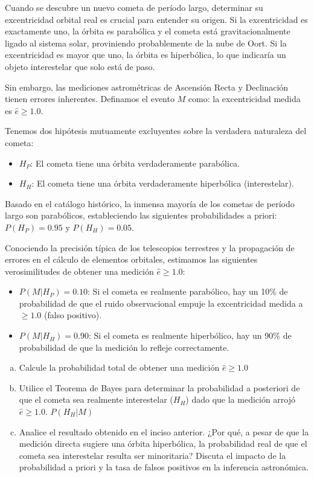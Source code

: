 \documentclass[a4paper]{article}
\begin{document}
Cuando se descubre un nuevo cometa de período largo, determinar su excentricidad orbital real es crucial para entender su origen. Si la excentricidad es exactamente uno, la órbita es parabólica y el cometa está gravitacionalmente ligado al sistema solar, proviniendo probablemente de la nube de Oort. Si la excentricidad es mayor que uno, la órbita es hiperbólica, lo que indicaría un objeto interestelar que solo está de paso.

Sin embargo, las mediciones astrométricas de Ascensión Recta y Declinación tienen errores inherentes. Definamos el evento $M$ como: la excentricidad medida es $\hat{e} \geq 1.0$.

Tenemos dos hipótesis mutuamente excluyentes sobre la verdadera naturaleza del cometa:
\begin{itemize}
\item $H_P$: El cometa tiene una órbita verdaderamente parabólica.
\item $H_H$: El cometa tiene una órbita verdaderamente hiperbólica (interestelar).
\end{itemize}

Basado en el catálogo histórico, la inmensa mayoría de los cometas de período largo son parabólicos, estableciendo las siguientes probabilidades a priori: $P(H_P) = 0.95$ y $P(H_H) = 0.05$.

Conociendo la precisión típica de los telescopios terrestres y la propagación de errores en el cálculo de elementos orbitales, estimamos las siguientes verosimilitudes de obtener una medición $\hat{e} \geq 1.0$:
\begin{itemize}
\item $P(M|H_P) = 0.10$: Si el cometa es realmente parabólico, hay un 10\% de probabilidad de que el ruido observacional empuje la excentricidad medida a $\geq 1.0$ (falso positivo).
\item $P(M|H_H) = 0.90$: Si el cometa es realmente hiperbólico, hay un 90\% de probabilidad de que la medición lo refleje correctamente.
\end{itemize}



\begin{enumerate}[a)]
\item Calcule la probabilidad total de obtener una medición $\hat{e} \geq 1.0$
\item Utilice el Teorema de Bayes para determinar la probabilidad a posteriori de que el cometa sea realmente interestelar ($H_H$) dado que la medición arrojó $\hat{e} \geq 1.0$. 
$P(H_H|M)$
\item Analice el resultado obtenido en el inciso anterior. ¿Por qué, a pesar de que la medición directa sugiere una órbita hiperbólica, la probabilidad real de que el cometa sea interestelar resulta ser minoritaria? Discuta el impacto de la probabilidad a priori y la tasa de falsos positivos en la inferencia astronómica.
\end{enumerate}
\end{document}
